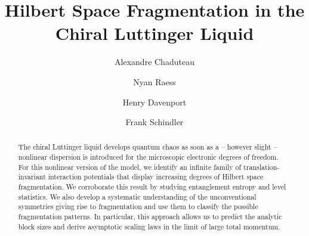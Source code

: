 \documentclass[aps,prx,10pt,twocolumn,amsmath,amssymb,superscriptaddress]{revtex4-2}
\theoremstyle{definition}
\theoremstyle{definition}
\begin{document}
\title{Hilbert Space Fragmentation in the Chiral Luttinger Liquid}

\author{Alexandre Chaduteau}

\author{Nyan Raess}

\author{Henry Davenport}

\author{Frank Schindler}

\begin{abstract}
The chiral Luttinger liquid develops quantum chaos as soon as a -- however slight -- nonlinear dispersion is introduced for the microscopic electronic degrees of freedom. For this nonlinear version of the model, we identify an infinite family of translation-invariant interaction potentials that display increasing degrees of Hilbert space fragmentation.
We corroborate this result by studying entanglement entropy and level statistics. We also develop a systematic understanding of the unconventional symmetries giving rise to fragmentation and use them to classify the possible fragmentation patterns. In particular, this approach allows us to predict the analytic block sizes and derive asymptotic scaling laws in the limit of large total momentum.
\end{abstract}

\maketitle
\end{document}
